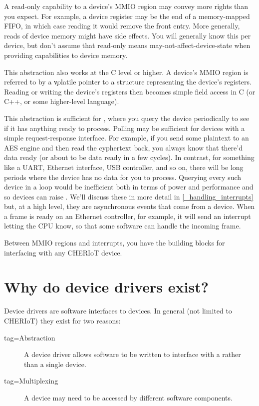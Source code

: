 \begin{caution}
A read-only capability to a device's MMIO region may convey more rights than you expect.
For example, a device register may be the end of a memory-mapped FIFO, in which case reading it would remove the front entry.
More generally, reads of device memory might have side effects.
You will generally know this per device, but don't assume that read-only means may-not-affect-device-state when providing capabilities to device memory.
\end{caution}

This abstraction also works at the C level or higher.
A device's MMIO region is referred to by a \c{volatile} pointer to a structure representing the device's registers.
Reading or writing the device's registers then becomes simple field access in C (or C++, or some higher-level language).

This abstraction is sufficient for , where you query the device periodically to see if it has anything ready to process.
Polling may be sufficient for devices with a simple request-response interface.
For example, if you send some plaintext to an AES engine and then read the cyphertext back, you always know that there'd data ready (or about to be data ready in a few cycles).
In contrast, for something like a UART, Ethernet interface, USB controller, and so on, there will be long periods where the device has no data for you to process.
Querying every such device in a loop would be inefficient both in terms of power and performance and so devices can raise .
We'll discuss these in more detail in \ref{_handling_interrupts} but, at a high level, they are asynchronous events that come from a device.
When a frame is ready on an Ethernet controller, for example, it will send an interrupt letting the CPU know, so that some software can handle the incoming frame.

Between MMIO regions and interrupts, you have the building blocks for interfacing with any CHERIoT device.

\section{Why do device drivers exist?}

Device drivers are software interfaces to devices.
In general (not limited to CHERIoT) they exist for two reasons:

\begin{description}
	\item[tag=Abstraction]{ A device driver allows software to be written to interface with a  rather than a single device.}
	\item[tag=Multiplexing]{ A device may need to be accessed by different software components.}
\end{description}

